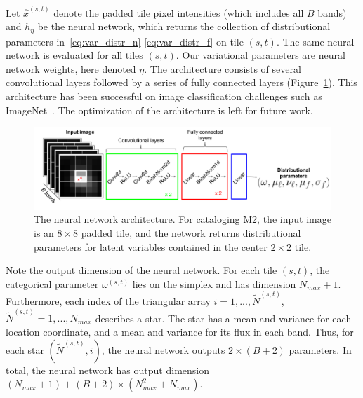 Let $\hat x^{(s,t)}$ denote the padded tile pixel intensities (which includes all $B$ bands) and $h_\eta$ be the neural network, which returns the collection of distributional parameters in~\eqref{eq:var_distr_n}-\eqref{eq:var_distr_f} on tile $(s,t)$. 
The same neural network is evaluated for all tiles $(s,t)$. Our variational parameters are neural network weights, here denoted $\eta$. 
The architecture consists of several convolutional layers followed by a series of fully connected layers (Figure~\ref{fig:starnet_arch}). 
This architecture has been successful on image classification challenges such as ImageNet~\citep{imagenet2015}. 
The optimization of the architecture is left for future work. 



\begin{figure}[!tb]
    \centering
    \includegraphics[width=\textwidth]{figures/vi_figures/starnet_archetecture4.png}
    \caption{The neural network architecture. For cataloging M2, the input image is an $8\times 8$ padded tile, and the network returns distributional parameters for latent variables contained in the center $2\times 2$ tile.
    }
    \label{fig:starnet_arch}
\end{figure}

Note the output dimension of the neural network. For each tile $(s,t)$, the categorical parameter $\omega^{(s,t)}$
lies on the simplex and has dimension $N_{max} + 1$. 
Furthermore, each index of the triangular array
$i = 1, ..., \tilde N^{(s,t)}$, $\tilde N^{(s,t)} = 1, ..., N_{max}$
describes a star. The star has a mean and variance for each location coordinate, and a mean and variance for its flux in each band. 
Thus, for each star $(\tilde N^{(s,t)}, i)$, 
the neural network outputs $2 \times (B + 2)$ parameters. 
In total, the neural network has output dimension $(N_{max} + 1) + (B + 2) \times (N_{max}^2 + N_{max})$. 

